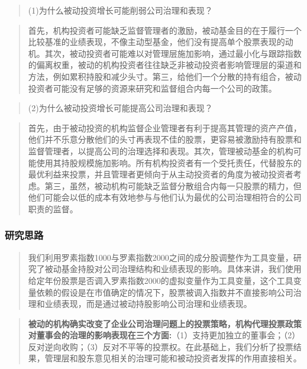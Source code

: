 \documentclass[
]{article}
\begin{document}
\begin{quote}
{(1)为什么被动投资增长可能削弱公司治理和表现？}
\end{quote}

\begin{quote}
首先，机构投资者可能缺乏监督管理者的激励，被动基金目的在于履行一个比较基准的业绩表现，不像主动型基金，他们没有提高单个股票表现的动机。其次，被动投资者可能难以对管理层施加影响，通过最小化与跟踪指数的偏离权重，被动的机构投资者往往缺乏非被动投资者影响管理层的渠道和方法，例如累积持股和减少头寸。第三，给他们一个分散的持有组合，被动投资者可能没有足够的资源来研究和监督组合内每一个公司的政策。
\end{quote}

\begin{quote}
{(2)为什么被动投资增长可能提高公司治理和表现？}
\end{quote}

\begin{quote}
首先，由于被动投资的机构监督企业管理者有利于提高其管理的资产产值，他们并不乐意分散他们的头寸再表现不佳的股票，更容易被激励持有股票和监督管理者，以提高公司的治理选择和表现。其次，管理被动基金的机构可能使用其持股规模施加影响。所有机构投资者有一个受托责任，代替股东的最优利益来投票，并且管理者更倾向于从主动投资者的角度为被动投资者考虑。第三，虽然，被动机构可能缺乏监督分散组合内每一只股票的精力，但他们可能会以低的成本有效地参与与他们认为最优的公司治理相符合的公司职责的监督。
\end{quote}

\hypertarget{ux7814ux7a76ux601dux8def-2}{%
\subsubsection{研究思路}\label{ux7814ux7a76ux601dux8def-2}}

\begin{quote}
我们利用罗素指数1000与罗素指数2000之间的成分股调整作为工具变量，研究了被动基金持股对公司治理结构和业绩表现的影响。具体来讲，我们使用给定年份股票是否调入罗素指数2000的虚拟变量作为工具变量，这个工具变量依赖的假设是在市值确定的情况下，股票被调入指数并不直接影响公司治理和业绩表现，而是通过被动持股影响公司治理和业绩表现。
\end{quote}

\begin{quote}
\textbf{被动的机构确实改变了企业公司治理问题上的投票策略，机构代理投票政策对董事会的治理的影响表现在三个方面:}（1）支持更加独立的董事会；（2）反对逆向收购；（3）反对不平等的投票权。在此基础上，我们分析了投票结果，管理层和股东意见相关的治理可能和被动投资者发挥的作用直接相关。
\end{quote}
\end{document}
